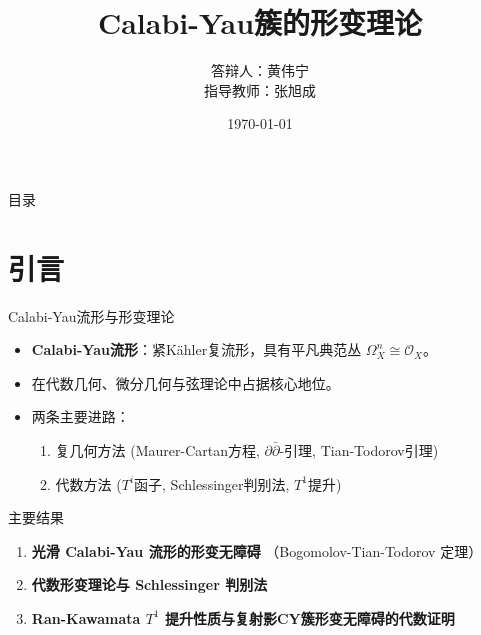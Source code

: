 \documentclass{beamer}
\title[Calabi-Yau簇的形变理论]{Calabi-Yau簇的形变理论}
\author[黄伟宁]{答辩人：黄伟宁\\ 指导教师：张旭成}
\institute[北京航空航天大学]{北京航空航天大学 \and 数学科学学院}
\date{\today}
\theoremstyle{definition}
\theoremstyle{plain}
\begin{document}
\begin{frame}
    \thispagestyle{empty}
    \maketitle
\end{frame}

\begin{frame}{目录}
    \tableofcontents[hideallsubsections]
\end{frame}

\section{引言}
\begin{frame}{Calabi-Yau流形与形变理论}
\begin{itemize}
    \item \textbf{Calabi-Yau流形}：紧Kähler复流形，具有平凡典范丛 $\Omega_X^n\cong\mathcal{O}_X$。
    \item 在代数几何、微分几何与弦理论中占据核心地位。
    \item 两条主要进路：
    \begin{enumerate}
        \item 复几何方法 (Maurer-Cartan方程, $\partial\bar\partial$-引理, Tian-Todorov引理)
        \item 代数方法 ($T^i$函子, Schlessinger判别法, $T^1$提升)
    \end{enumerate}
\end{itemize}
\end{frame}

\begin{frame}{主要结果}
\begin{enumerate}
    \item \textbf{光滑 Calabi-Yau 流形的形变无障碍} （Bogomolov-Tian-Todorov 定理）
    \item \textbf{代数形变理论与 Schlessinger 判别法}
    \item \textbf{Ran-Kawamata $T^1$ 提升性质与复射影CY簇形变无障碍的代数证明} 
\end{enumerate}
\end{frame}
\end{document}
